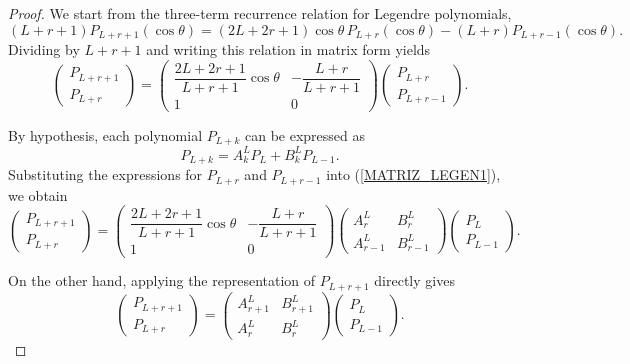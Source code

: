 \documentclass[10pt,a4paper]{amsart}
\renewcommand\eqref[1]{(\ref{#1})} %
\begin{document}
\begin{proof}
We start from the three-term recurrence relation for Legendre polynomials,
\[
(L+r+1) P_{L+r+1}(\cos\theta)
= (2L+2r+1)\cos\theta\, P_{L+r}(\cos\theta)
- (L+r) P_{L+r-1}(\cos\theta).
\]
Dividing by $L+r+1$ and writing this relation in matrix form yields
\begin{equation}\label{MATRIZ_LEGEN1}
\begin{pmatrix}
P_{L+r+1} \\
P_{L+r}
\end{pmatrix}
=
\begin{pmatrix}
\dfrac{2L+2r+1}{L+r+1}\cos\theta &
-\dfrac{L+r}{L+r+1} \\
1 & 0
\end{pmatrix}
\begin{pmatrix}
P_{L+r} \\
P_{L+r-1}
\end{pmatrix}.
\end{equation}

By hypothesis, each polynomial $P_{L+k}$ can be expressed as
\[
P_{L+k}
= A_k^L P_L + B_k^L P_{L-1}.
\]
Substituting the expressions for $P_{L+r}$ and $P_{L+r-1}$ into
\eqref{MATRIZ_LEGEN1}, we obtain
\begin{equation}\label{EQmatrix1}
\begin{pmatrix}
P_{L+r+1} \\
P_{L+r}
\end{pmatrix}
=
\begin{pmatrix}
\dfrac{2L+2r+1}{L+r+1}\cos\theta &
-\dfrac{L+r}{L+r+1} \\
1 & 0
\end{pmatrix}
\begin{pmatrix}
A_r^L & B_r^L \\
A_{r-1}^L & B_{r-1}^L
\end{pmatrix}
\begin{pmatrix}
P_L \\
P_{L-1}
\end{pmatrix}.
\end{equation}

On the other hand, applying the representation of $P_{L+r+1}$ directly gives
\[
\begin{pmatrix}
P_{L+r+1} \\
P_{L+r}
\end{pmatrix}
=
\begin{pmatrix}
A_{r+1}^L & B_{r+1}^L \\
A_r^L & B_r^L
\end{pmatrix}
\begin{pmatrix}
P_L \\
P_{L-1}
\end{pmatrix}.
\]


\end{proof}
\end{document}
